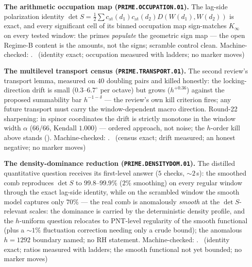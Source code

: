 \documentclass[11pt,a4paper]{article}
\theoremstyle{definition}
\begin{document}
\par\smallskip\noindent\textbf{The arithmetic occupation map
(\texttt{PRIME.OCCUPATION.01}).}
The lag-side polarization identity $\det S=\tfrac12\sum
c_{\mathrm{at}}(d_1)c_{\mathrm{at}}(d_2)D(W(d_1),W(d_2))$ is exact, and
every significant cell of its binned occupation map sign-matches
$K_\infty$ on every tested window: the primes \emph{populate} the
geometric sign map --- the open Regime-B content is the amounts, not the
signs; scramble control clean. Machine-checked:
.
\mE\ (identity exact; occupation measured with ladders; no marker moves)
\par\smallskip

\par\smallskip\noindent\textbf{The multilevel transport census
(\texttt{PRIME.TRANSPORT.01}).}
The second review's transport lemma, measured on $40$ doubling pairs and
killed honestly: the locking-direction drift is small
($0.3$--$6.7^\circ$ per octave) but grows ($h^{+0.36}$) against the
proposed summability bar $h^{-1-\delta}$ --- the review's own kill
criterion fires; any future transport must carry the window-dependent
macro direction.  Round-22 sharpening: in spinor coordinates the
drift is strictly monotone in the window width $\alpha$ ($66/66$,
Kendall $1.000$) --- ordered approach, not noise; the $h$-order kill
above stands ().
Machine-checked: .
\mE\ (census exact; drift measured; an honest negative; no marker moves)
\par\smallskip

\par\smallskip\noindent\textbf{The density-dominance reduction
(\texttt{PRIME.DENSITYDOM.01}).}
The distilled quantitative question receives its first-level answer
($5$ checks, ${\sim}2$\,s): the smoothed comb reproduces $\det S$ to
$99.8$--$99.9\%$ ($2\%$ smoothing) on every regular window through the
exact lag-side identity, while on the scrambled window the smooth model
captures only $70\%$ --- the real comb is anomalously \emph{smooth} at
the $\det S$-relevant scales: the dominance is carried by the
deterministic density profile, and the $h$-uniform question relocates to
PNT-level regularity of the smooth functional (plus a ${\sim}1\%$
fluctuation correction needing only a crude bound); the anomalous
$h=1292$ boundary named; no RH statement. Machine-checked:
.
\mE\ (identity exact; ratios measured with ladders; the smooth
functional not yet bounded; no marker moves)
\par\smallskip
\end{document}
